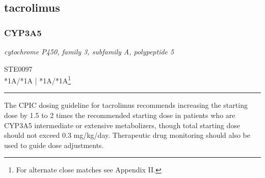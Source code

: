 \documentclass{report}
\begin{document}
      \newpage
      \normalsize











\subsection{ tacrolimus }

\subsubsection{ CYP3A5 }
     \textit{ cytochrome P450, family 3, subfamily A, polypeptide 5 } \begin{flushright} \textsc{ STE0097 \\ *1A/*1A  | *1A/*1A\footnote{For alternate close matches see Appendix II.} }\end{flushright}
      \hrule \vspace{6pt}
      The CPIC dosing guideline for tacrolimus recommends increasing the starting dose by 1.5 to 2 times the recommended starting dose in patients who are CYP3A5 intermediate or extensive metabolizers, though total starting dose should not exceed 0.3 mg/kg/day. Therapeutic drug monitoring should also be used to guide dose adjustments. \newline
      \scriptsize
      
\end{document}
